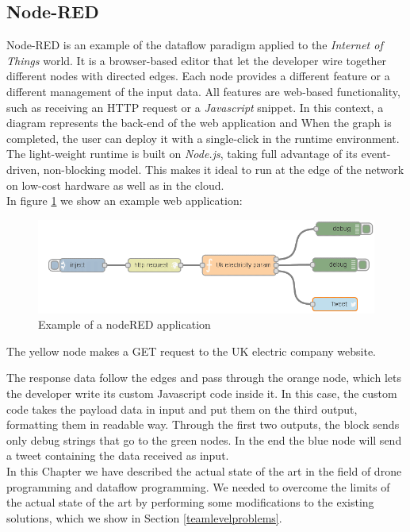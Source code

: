 \subsection{Node-RED}\label{NodeRed}

Node-RED is an example of the dataflow paradigm applied to the \textit{Internet of Things} world.
It is a browser-based editor that let the developer wire together different nodes with directed edges.
Each node provides a different feature or a different management of the input data.
All features are web-based functionality, such as receiving an HTTP request or a \textit{Javascript} snippet.
In this context, a diagram represents the back-end of the web application and When the graph is completed, the user can deploy it with a single-click in the runtime environment.
The light-weight runtime is built on \textit{Node.js}, taking full advantage of its event-driven, non-blocking model. This makes it ideal to run at the edge of the network on low-cost hardware as well as in the cloud.
\\

In figure \ref{fig:nodeRed} we show an example web application:


 \begin{figure}[htbp]
   \centering
   \includegraphics[width=\linewidth]{pictures/nodeRed.png}
   \caption{Example of a nodeRED application}
   \label{fig:nodeRed}
 \end{figure}

The yellow node makes a GET request to the UK electric company website.

The response data follow the edges and pass through the orange node, which lets the developer write its custom Javascript code inside it. 
In this case, the custom code takes the payload data in input and put them on the third output, formatting them in readable way. 
Through the first two outputs, the block sends only debug strings that go to the green nodes.
In the end the blue node will send a tweet containing the data received as input.
\\

In this Chapter we have described the actual state of the art in the field of drone programming and dataflow programming.
We needed to overcome the limits of the actual state of the art by performing some modifications to the existing solutions, which we show in Section \ref{teamlevelproblems}.



